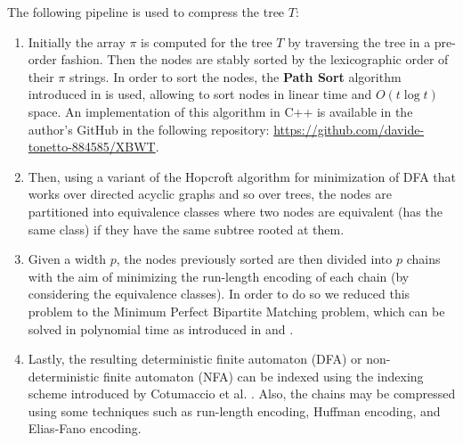 The following pipeline is used to compress the tree $T$:
\begin{enumerate}
    \item Initially the array $\pi$ is computed for the tree $T$ by traversing the tree in a pre-order fashion. Then the nodes are stably sorted by the lexicographic order of their $\pi$ strings. In order to sort the nodes, the \textbf{Path Sort} algorithm introduced in \cite{ferragina2009compressing} is used, allowing to sort nodes in linear time and $O(t \log t)$ space. An implementation of this algorithm in C++ is available in the author's GitHub in the following repository: \url{https://github.com/davide-tonetto-884585/XBWT}.
    \item Then, using a variant of the Hopcroft algorithm for minimization of DFA \cite{HOPCROFT1971189} that works over directed acyclic graphs \cite{revuz1992minimisation} and so over trees, the nodes are partitioned into equivalence classes where two nodes are equivalent (has the same class) if they have the same subtree rooted at them.
    \item Given a width $p$, the nodes previously sorted are then divided into $p$ chains with the aim of minimizing the run-length encoding of each chain (by considering the equivalence classes). In order to do so we reduced this problem to the Minimum Perfect Bipartite Matching problem, which can be solved in polynomial time as introduced in \cite{chen2022maximum} and \cite{sankowski2009maximum}.
    \item Lastly, the resulting deterministic finite automaton (DFA) or non-deterministic finite automaton (NFA) can be indexed using the indexing scheme introduced by Cotumaccio et al. \cite{cotumaccio2023co}. Also, the chains may be compressed using some techniques such as run-length encoding, Huffman encoding, and Elias-Fano encoding.
\end{enumerate}